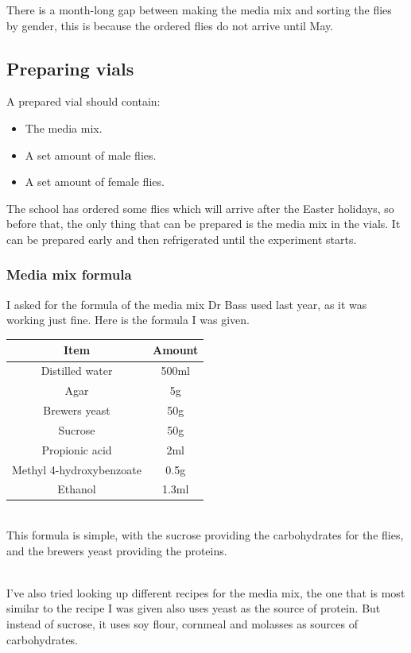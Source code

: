 \documentclass{article}
\begin{document}
\noindent
There is a month-long gap between making the media mix and sorting the flies by gender, this is because the ordered flies do not arrive until May.

\subsection{Preparing vials}

A prepared vial should contain:

\begin{itemize}
    \item The media mix.
    \item A set amount of male flies.
    \item A set amount of female flies.
\end{itemize}

\noindent
The school has ordered some flies which will arrive after the Easter holidays, so before that, the only thing that can be prepared is the media mix in the vials. It can be prepared early and then refrigerated until the experiment starts.

\subsubsection{Media mix formula}

I asked for the formula of the media mix Dr Bass used last year, as it was working just fine. Here is the formula I was given.

{
\centering
\begin{tabular}{|c|c|}
  \hline
  Item & Amount\\
  \hline
  \hline
  Distilled water & 500ml\\
  Agar & 5g\\
  Brewers yeast & 50g\\
  Sucrose & 50g\\
  Propionic acid & 2ml\\
  Methyl 4-hydroxybenzoate & 0.5g\\
  Ethanol & 1.3ml\\
  \hline
\end{tabular}
\par
}

\noindent\\
This formula is simple, with the sucrose providing the carbohydrates for the flies, and the brewers yeast providing the proteins.

\noindent\\
I've also tried looking up different recipes for the media mix, the one that is most similar to the recipe I was given\cite{sim_recipe} also uses yeast as the source of protein. But instead of sucrose, it uses soy flour, cornmeal and molasses as sources of carbohydrates.
\end{document}
